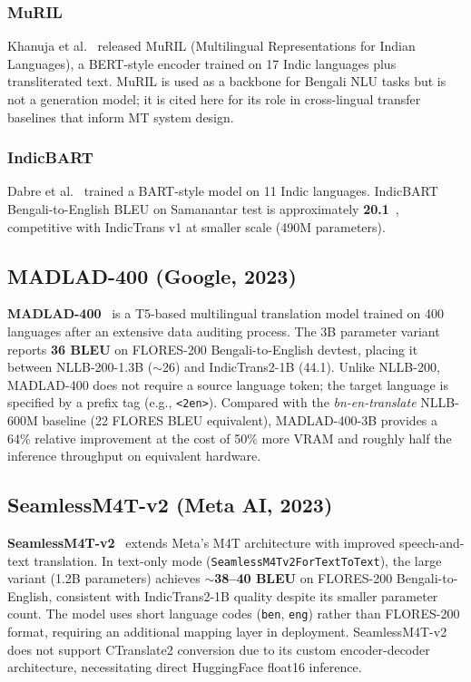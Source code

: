 \documentclass[conference]{IEEEtran}
\begin{document}
\subsubsection{MuRIL}
Khanuja et al.~\cite{khanuja2021muril} released MuRIL
(Multilingual Representations for Indian Languages), a BERT-style encoder
trained on 17 Indic languages plus transliterated text.
MuRIL is used as a backbone for Bengali NLU tasks but is not a generation
model; it is cited here for its role in cross-lingual transfer baselines
that inform MT system design.

\subsubsection{IndicBART}
Dabre et al.~\cite{dabre2022indicbart} trained a BART-style model on 11
Indic languages.
IndicBART Bengali-to-English BLEU on Samanantar test is approximately
\textbf{20.1}~\cite{dabre2022indicbart}, competitive with IndicTrans v1
at smaller scale (490M parameters).

\subsection{MADLAD-400 (Google, 2023)}

\textbf{MADLAD-400}~\cite{kudugunta2023madlad} is a T5-based multilingual translation model
trained on 400 languages after an extensive data auditing process.
The 3B parameter variant reports \textbf{36 BLEU} on FLORES-200 Bengali-to-English
devtest, placing it between NLLB-200-1.3B ($\sim$26) and IndicTrans2-1B (44.1).
Unlike NLLB-200, MADLAD-400 does not require a source language token;
the target language is specified by a prefix tag (e.g., \texttt{<2en>}).
Compared with the \textit{bn-en-translate} NLLB-600M baseline (22 FLORES BLEU equivalent),
MADLAD-400-3B provides a 64\% relative improvement at the cost of 50\% more VRAM and
roughly half the inference throughput on equivalent hardware.

\subsection{SeamlessM4T-v2 (Meta AI, 2023)}

\textbf{SeamlessM4T-v2}~\cite{seamlessm4t2023} extends Meta's M4T architecture with
improved speech-and-text translation.
In text-only mode (\texttt{SeamlessM4Tv2ForTextToText}), the large variant (1.2B parameters)
achieves $\sim$\textbf{38--40 BLEU} on FLORES-200 Bengali-to-English,
consistent with IndicTrans2-1B quality despite its smaller parameter count.
The model uses short language codes (\texttt{ben}, \texttt{eng}) rather than FLORES-200
format, requiring an additional mapping layer in deployment.
SeamlessM4T-v2 does not support CTranslate2 conversion due to its custom encoder-decoder
architecture, necessitating direct HuggingFace float16 inference.
\end{document}
